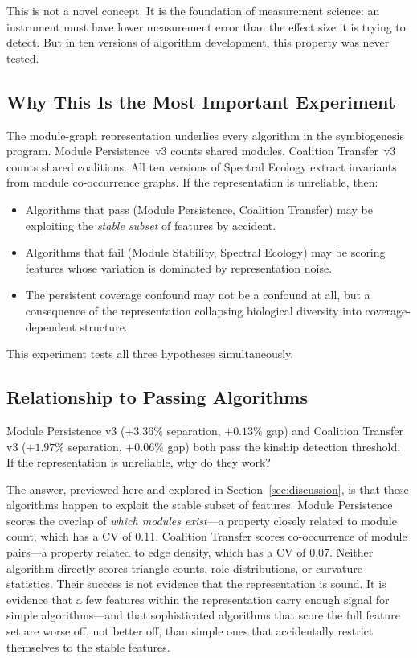 \documentclass{../yalumba}
\begin{document}
This is not a novel concept.  It is the foundation of measurement
science: an instrument must have lower measurement error than the effect
size it is trying to detect.  But in ten versions of algorithm
development, this property was never tested.

\subsection{Why This Is the Most Important Experiment}

The module-graph representation underlies every algorithm in the
symbiogenesis program.  Module Persistence~v3 counts shared modules.
Coalition Transfer~v3 counts shared coalitions.  All ten versions of
Spectral Ecology extract invariants from module co-occurrence graphs.
If the representation is unreliable, then:

\begin{itemize}
  \item Algorithms that pass (Module Persistence, Coalition Transfer)
    may be exploiting the \emph{stable subset} of features by accident.
  \item Algorithms that fail (Module Stability, Spectral Ecology) may
    be scoring features whose variation is dominated by representation
    noise.
  \item The persistent coverage confound may not be a confound at all,
    but a consequence of the representation collapsing biological
    diversity into coverage-dependent structure.
\end{itemize}

This experiment tests all three hypotheses simultaneously.

\subsection{Relationship to Passing Algorithms}

Module Persistence v3 ($+3.36\%$ separation, $+0.13\%$ gap) and
Coalition Transfer v3 ($+1.97\%$ separation, $+0.06\%$ gap) both pass
the kinship detection threshold.  If the representation is unreliable,
why do they work?

The answer, previewed here and explored in Section~\ref{sec:discussion},
is that these algorithms happen to exploit the stable subset of
features.  Module Persistence scores the overlap of \emph{which modules
exist}---a property closely related to module count, which has a CV of
0.11.  Coalition Transfer scores co-occurrence of module pairs---a
property related to edge density, which has a CV of 0.07.  Neither
algorithm directly scores triangle counts, role distributions, or
curvature statistics.  Their success is not evidence that the
representation is sound.  It is evidence that a few features within the
representation carry enough signal for simple algorithms---and that
sophisticated algorithms that score the full feature set are worse off,
not better off, than simple ones that accidentally restrict themselves
to the stable features.
\end{document}
